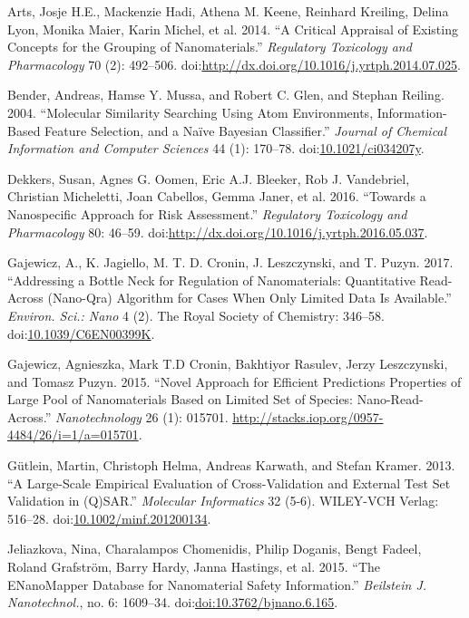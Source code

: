 \documentclass[utf8]{frontiersHLTH} %
\begin{document}
\hypertarget{ref-Arts14}{}
Arts, Josje H.E., Mackenzie Hadi, Athena M. Keene, Reinhard Kreiling,
Delina Lyon, Monika Maier, Karin Michel, et al. 2014. ``A Critical
Appraisal of Existing Concepts for the Grouping of Nanomaterials.''
\emph{Regulatory Toxicology and Pharmacology} 70 (2): 492--506.
doi:\href{https://doi.org/http://dx.doi.org/10.1016/j.yrtph.2014.07.025}{http://dx.doi.org/10.1016/j.yrtph.2014.07.025}.

\hypertarget{ref-Bender04}{}
Bender, Andreas, Hamse Y. Mussa, and Robert C. Glen, and Stephan
Reiling. 2004. ``Molecular Similarity Searching Using Atom Environments,
Information-Based Feature Selection, and a Naïve Bayesian Classifier.''
\emph{Journal of Chemical Information and Computer Sciences} 44 (1):
170--78.
doi:\href{https://doi.org/10.1021/ci034207y}{10.1021/ci034207y}.

\hypertarget{ref-Dekkers16}{}
Dekkers, Susan, Agnes G. Oomen, Eric A.J. Bleeker, Rob J. Vandebriel,
Christian Micheletti, Joan Cabellos, Gemma Janer, et al. 2016. ``Towards
a Nanospecific Approach for Risk Assessment.'' \emph{Regulatory
Toxicology and Pharmacology} 80: 46--59.
doi:\href{https://doi.org/http://dx.doi.org/10.1016/j.yrtph.2016.05.037}{http://dx.doi.org/10.1016/j.yrtph.2016.05.037}.

\hypertarget{ref-Gajewicz17}{}
Gajewicz, A., K. Jagiello, M. T. D. Cronin, J. Leszczynski, and T.
Puzyn. 2017. ``Addressing a Bottle Neck for Regulation of Nanomaterials:
Quantitative Read-Across (Nano-Qra) Algorithm for Cases When Only
Limited Data Is Available.'' \emph{Environ. Sci.: Nano} 4 (2). The Royal
Society of Chemistry: 346--58.
doi:\href{https://doi.org/10.1039/C6EN00399K}{10.1039/C6EN00399K}.

\hypertarget{ref-Gajewicz14}{}
Gajewicz, Agnieszka, Mark T.D Cronin, Bakhtiyor Rasulev, Jerzy
Leszczynski, and Tomasz Puzyn. 2015. ``Novel Approach for Efficient
Predictions Properties of Large Pool of Nanomaterials Based on Limited
Set of Species: Nano-Read-Across.'' \emph{Nanotechnology} 26 (1):
015701. \url{http://stacks.iop.org/0957-4484/26/i=1/a=015701}.

\hypertarget{ref-Guxfctlein2013}{}
Gütlein, Martin, Christoph Helma, Andreas Karwath, and Stefan Kramer.
2013. ``A Large-Scale Empirical Evaluation of Cross-Validation and
External Test Set Validation in (Q)SAR.'' \emph{Molecular Informatics}
32 (5-6). WILEY-VCH Verlag: 516--28.
doi:\href{https://doi.org/10.1002/minf.201200134}{10.1002/minf.201200134}.

\hypertarget{ref-Jeliazkova15}{}
Jeliazkova, Nina, Charalampos Chomenidis, Philip Doganis, Bengt Fadeel,
Roland Grafström, Barry Hardy, Janna Hastings, et al. 2015. ``The
ENanoMapper Database for Nanomaterial Safety Information.''
\emph{Beilstein J. Nanotechnol.}, no. 6: 1609--34.
doi:\href{https://doi.org/doi:10.3762/bjnano.6.165}{doi:10.3762/bjnano.6.165}.
\end{document}
